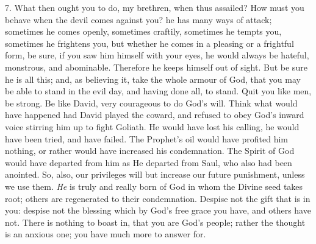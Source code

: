 7. What then ought you to do, my brethren, when thus assailed? How
must you behave when the devil comes against you? he has many ways of
attack; sometimes he comes openly, sometimes craftily, sometimes he
tempts you, sometimes he frightens you, but whether he comes in a
pleasing or a frightful form, be sure, if you saw him himself with
your eyes, he would always be hateful, monstrous, and abominable.
Therefore he keeps himself out of sight. But be sure he is all this;
and, as believing it, take the whole armour of God, that you may be
able to stand in the evil day, and having done all, to stand. Quit you
like men, be strong. Be like David, very courageous to do God's will.
Think what would have happened had David played the coward, and
refused to obey God's inward voice stirring him up to fight Goliath.
He would have lost his calling, he would have been tried, and have
failed. The Prophet's oil would have profited him nothing, or rather
would have increased his condemnation. The Spirit of God would have
departed from him as He departed from Saul, who also had been
anointed. So, also, our privileges will but increase our future
punishment, unless we use them. \emph{He} is truly and really born of
God in whom the Divine seed takes root; others are regenerated to
their condemnation. Despise not the gift that is in you: despise not
the blessing which by God's free grace you have, and others have not.
There is nothing to boast in, that you are God's people; rather the
thought is an anxious one; you have much more to answer for.


